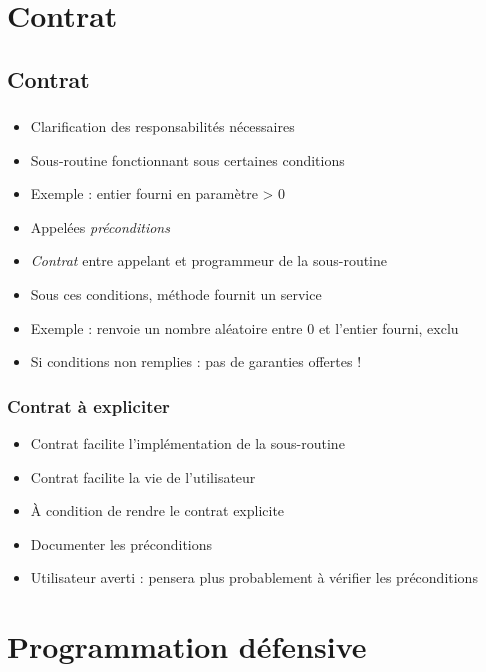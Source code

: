 \documentclass[english, french]{beamer}
\begin{document}
\section{Contrat}
\subsection{Contrat}
\begin{frame}
	\frametitle{\subsecname}
	\begin{itemize}
		\item Clarification des responsabilités nécessaires
		\item Sous-routine fonctionnant sous certaines conditions
		\item Exemple : entier fourni en paramètre > 0
		\item Appelées \emph{préconditions}
		\item \emph{Contrat} entre appelant et programmeur de la sous-routine
		\item Sous ces conditions, méthode fournit un service
		\item Exemple : renvoie un nombre aléatoire entre 0 et l’entier fourni, exclu
		\item Si conditions non remplies : pas de garanties offertes !
	\end{itemize}
\end{frame}

\begin{frame}
	\frametitle{Contrat à expliciter}
	\begin{itemize}
		\item Contrat facilite l’implémentation de la sous-routine
		\item Contrat facilite la vie de l’utilisateur
		\item À condition de rendre le contrat explicite
		\item Documenter les préconditions
		\item Utilisateur averti : pensera plus probablement à vérifier les préconditions
	\end{itemize}
\end{frame}

\section{Programmation défensive}
\end{document}
